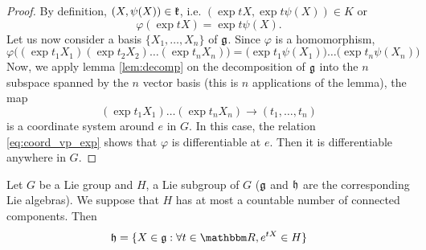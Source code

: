 \begin{proof}
By definition, $(X,\psi(X))\in\mathfrak{k}$, i.e. $(\exp tX,\exp t\psi(X))\in K$ or 
\begin{equation}
  \varphi(\exp tX)=\exp t\psi(X).
\end{equation}
Let us now consider a basis $\{X_1,\ldots,X_n\}$ of $\mathfrak{g}$. Since $\varphi$ is a homomorphism,
\begin{equation}\label{eq:coord_vp_exp}
   \varphi\big((\exp t_1X_1)(\exp t_2X_2)\ldots(\exp t_nX_n)\big)
     =\big(\exp t_1\psi(X_1)\big)\ldots\big( \exp t_n\psi(X_n) \big) 
\end{equation}
Now, we apply lemma \ref{lem:decomp} on the decomposition of $\mathfrak{g}$ into the $n$ subspace spanned by the $n$ vector basis (this is $n$ applications of the lemma), the map
\[
  (\exp t_1X_1)\ldots(\exp t_nX_n)\to (t_1,\ldots,t_n)
\]
is a coordinate system around $e$ in $G$. In this case, the relation \eqref{eq:coord_vp_exp} shows that $\varphi$ is differentiable at $e$. Then it is differentiable anywhere in $G$.
\end{proof}


\begin{proposition}
Let $G$ be a Lie group and $H$, a Lie subgroup of $G$ ($\mathfrak{g}$ and $\mathfrak{h}$ are the corresponding Lie algebras). We suppose that $H$ has at most a countable number of connected components. Then 
\begin{equation}
  \lH=\{ X\in\lG:\forall t\in\eR,e^{tX}\in H \}
\end{equation}
\end{proposition}


